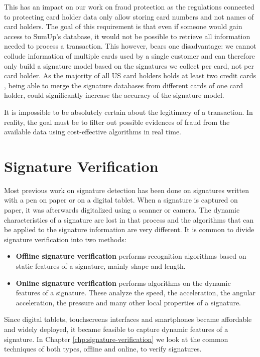 \documentclass[a4paper, oneside]{csthesis}
\begin{document}
This has an impact on our work on fraud protection as the regulations connected to  protecting card holder data only allow storing card numbers and not names of card holders. The goal of this requirement is that even if someone would gain access to SumUp's database, it would not be possible to retrieve all information needed to process a transaction. This however, bears one disadvantage: we cannot collude information of multiple cards used by a single customer and can therefore only build a signature model based on the signatures we collect per card, not per card holder. As the majority of all US card holders holds at least two credit cards \cite{woolsey2010credit}, being able to merge the signature databases from different cards of one card holder, could significantly increase the accuracy of the signature model.

It is impossible to be absolutely certain about the legitimacy of a transaction. In reality, the goal must be to filter out possible evidences of fraud from the available data using cost-effective algorithms in real time.


\section{Signature Verification}

Most previous work on signature detection has been done on signatures written with a pen on paper or on a digital tablet. When a signature is captured on paper, it was afterwards digitalized using a scanner or camera. The dynamic characteristics of a signature are lost in that process and the algorithms that can be applied to the signature information are very different. It is common to divide signature verification into two methods:

\begin{itemize}
\item \textbf{Offline signature verification} performs recognition algorithms based on static features of a signature, mainly shape and length.
\item \textbf{Online signature verification} performs algorithms on the dynamic features of a signature. These analyze the speed, the acceleration, the angular acceleration, the pressure and many other local properties of a signature.
\end{itemize}

Since digital tablets, touchscreens interfaces and smartphones became affordable and widely deployed, it became feasible to capture dynamic features of a signature. In Chapter \ref{chp:signature-verification} we look at the common techniques of both types, offline and online, to verify signatures.
\end{document}
